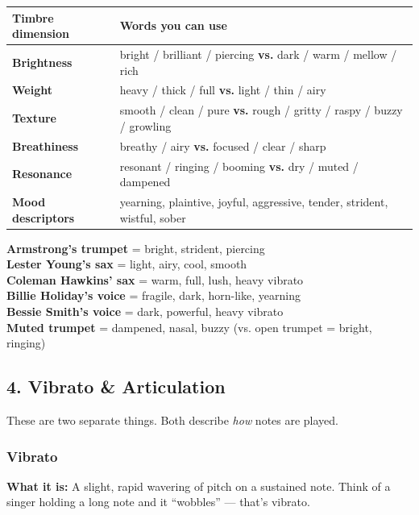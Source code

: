 \documentclass[11pt,letterpaper]{article}
\begin{document}
\begin{small}
\begin{tabularx}{\textwidth}{>{\bfseries}p{3cm} X}
\toprule
\textbf{Timbre dimension} & \textbf{Words you can use} \\
\midrule
Brightness & bright / brilliant / piercing \textbf{vs.} dark / warm / mellow / rich \\
Weight & heavy / thick / full \textbf{vs.} light / thin / airy \\
Texture & smooth / clean / pure \textbf{vs.} rough / gritty / raspy / buzzy / growling \\
Breathiness & breathy / airy \textbf{vs.} focused / clear / sharp \\
Resonance & resonant / ringing / booming \textbf{vs.} dry / muted / dampened \\
Mood descriptors & yearning, plaintive, joyful, aggressive, tender, strident, wistful, sober \\
\bottomrule
\end{tabularx}
\end{small}

\begin{tcolorbox}[examplebox, title={Timbre examples from your listening}]
\textbf{Armstrong's trumpet} = bright, strident, piercing\\
\textbf{Lester Young's sax} = light, airy, cool, smooth\\
\textbf{Coleman Hawkins' sax} = warm, full, lush, heavy vibrato\\
\textbf{Billie Holiday's voice} = fragile, dark, horn-like, yearning\\
\textbf{Bessie Smith's voice} = dark, powerful, heavy vibrato\\
\textbf{Muted trumpet} = dampened, nasal, buzzy (vs. open trumpet = bright, ringing)
\end{tcolorbox}

\subsection{4. Vibrato \& Articulation}

These are two separate things. Both describe \emph{how} notes are played.

\subsubsection{Vibrato}
\textbf{What it is:} A slight, rapid wavering of pitch on a sustained note. Think of a singer holding a long note and it ``wobbles'' --- that's vibrato.
\end{document}
